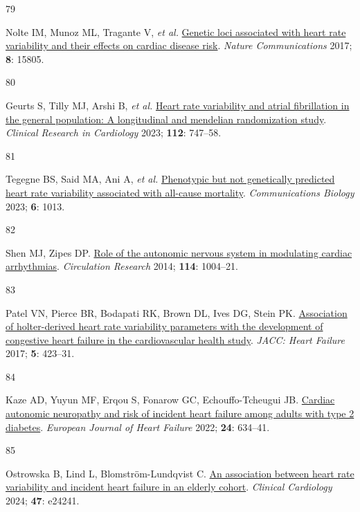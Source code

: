 \documentclass[
  a4paper,
  headsepline=true,
  open=any]{scrbook}
\newlength{\cslhangindent}
\newlength{\csllabelwidth}
\newlength{\cslentryspacingunit} %
\newenvironment{CSLReferences}[2] %
 {%
  \setlength{\parindent}{0pt}
  \ifodd #1
  \let\oldpar\par
  \def\par{\hangindent=\cslhangindent\oldpar}
  \fi
  \setlength{\parskip}{#2\cslentryspacingunit}
 }%
 {}
\newcommand{\CSLLeftMargin}[1]{\parbox[t]{\csllabelwidth}{#1}}
\newcommand{\CSLRightInline}[1]{\parbox[t]{\linewidth - \csllabelwidth}{#1}\break}
\begin{document}
\begin{CSLReferences}{0}{0}
\leavevmode{}%
\CSLLeftMargin{79 }%
\CSLRightInline{Nolte IM, Munoz ML, Tragante V, \emph{et al.}
\href{https://doi.org/10.1038/ncomms15805}{Genetic loci associated with
heart rate variability and their effects on cardiac disease risk}.
\emph{Nature Communications} 2017; \textbf{8}: 15805.}

\leavevmode{}%
\CSLLeftMargin{80 }%
\CSLRightInline{Geurts S, Tilly MJ, Arshi B, \emph{et al.}
\href{https://doi.org/10.1007/s00392-022-02072-5}{Heart rate variability
and atrial fibrillation in the general population: A longitudinal and
mendelian randomization study}. \emph{Clinical Research in Cardiology}
2023; \textbf{112}: 747--58.}

\leavevmode{}%
\CSLLeftMargin{81 }%
\CSLRightInline{Tegegne BS, Said MA, Ani A, \emph{et al.}
\href{https://doi.org/10.1038/s42003-023-05376-y}{Phenotypic but not
genetically predicted heart rate variability associated with all-cause
mortality}. \emph{Communications Biology} 2023; \textbf{6}: 1013.}

\leavevmode{}%
\CSLLeftMargin{82 }%
\CSLRightInline{Shen MJ, Zipes DP.
\href{https://doi.org/10.1161/CIRCRESAHA.113.302549}{Role of the
autonomic nervous system in modulating cardiac arrhythmias}.
\emph{Circulation Research} 2014; \textbf{114}: 1004--21.}

\leavevmode{}%
\CSLLeftMargin{83 }%
\CSLRightInline{Patel VN, Pierce BR, Bodapati RK, Brown DL, Ives DG,
Stein PK. \href{https://doi.org/10.1016/j.jchf.2016.12.015}{Association
of holter-derived heart rate variability parameters with the development
of congestive heart failure in the cardiovascular health study}.
\emph{JACC: Heart Failure} 2017; \textbf{5}: 423--31.}

\leavevmode{}%
\CSLLeftMargin{84 }%
\CSLRightInline{Kaze AD, Yuyun MF, Erqou S, Fonarow GC,
Echouffo-Tcheugui JB. \href{https://doi.org/10.1002/ejhf.2432}{Cardiac
autonomic neuropathy and risk of incident heart failure among adults
with type 2 diabetes}. \emph{European Journal of Heart Failure} 2022;
\textbf{24}: 634--41.}

\leavevmode{}%
\CSLLeftMargin{85 }%
\CSLRightInline{Ostrowska B, Lind L, Blomström-Lundqvist C.
\href{https://doi.org/10.1002/clc.24241}{An association between heart
rate variability and incident heart failure in an elderly cohort}.
\emph{Clinical Cardiology} 2024; \textbf{47}: e24241.}


\end{CSLReferences}
\end{document}
